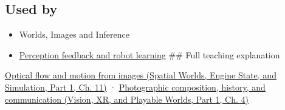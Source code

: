\subsection{Used by}\label{appendix-e2e73f8cd93e-used-by}

\hypertarget{appendix-e2e73f8cd93e-used-by}{}

\begin{itemize}
\item
  {Worlds, Images and Inference}
\item
  \hyperref[appendix-b0c42da325f1]{Perception feedback and robot learning} \#\# Full teaching explanation
\end{itemize}

\href{../05-Spatial-Worlds-Engine-State-and-Simulation-P01/main.pdf\#04-visual-computing-ii-ch030-optical-flow-and-motion-from-images}{Optical flow and motion from images (Spatial Worlds, Engine State, and Simulation, Part 1, Ch. 11)} · \href{../07-Vision-XR-and-Playable-Worlds-P01/main.pdf\#04-visual-computing-ii-ch034-photographic-composition-history-and-communication}{Photographic composition, history, and communication (Vision, XR, and Playable Worlds, Part 1, Ch. 4)}
